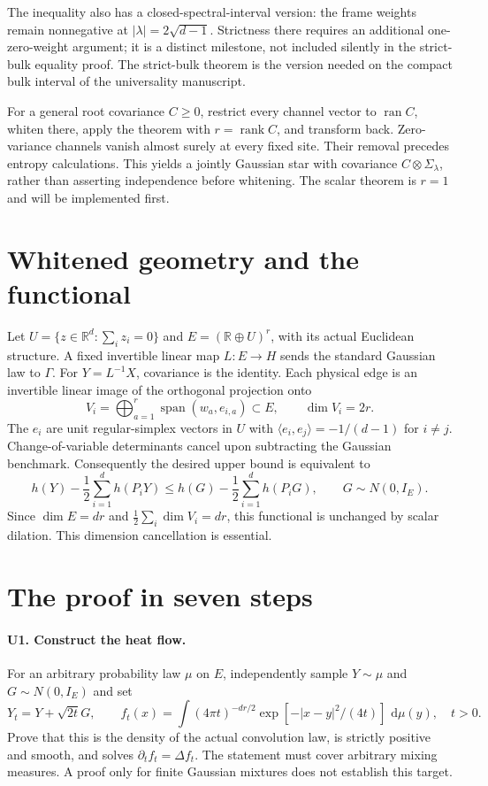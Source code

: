 \documentclass[11pt]{article}
\newcommand{\R}{\mathbb R}
\newcommand{\dd}{\,\mathrm d}
\begin{document}
The inequality also has a closed-spectral-interval version: the frame
weights remain nonnegative at $|\lambda|=2\sqrt{d-1}$. Strictness there
requires an additional one-zero-weight argument; it is a distinct
milestone, not included silently in the strict-bulk equality proof.
The strict-bulk theorem is the version needed on the compact bulk
interval of the universality manuscript.

For a general root covariance $C\geq0$, restrict every channel vector
to $\operatorname{ran}C$, whiten there, apply the theorem with
$r=\operatorname{rank}C$, and transform back. Zero-variance channels
vanish almost surely at every fixed site. Their removal precedes entropy
calculations. This yields a jointly Gaussian star with covariance
$C\otimes\Sigma_\lambda$, rather than asserting independence before
whitening. The scalar theorem is $r=1$ and will be implemented first.

\section{Whitened geometry and the functional}
Let $U=\{z\in\R^d:\sum_i z_i=0\}$ and
$E=(\R\oplus U)^r$, with its actual Euclidean structure. A fixed invertible
linear map $L:E\to H$ sends the standard Gaussian law to $\Gamma$.
For $Y=L^{-1}X$, covariance is the identity. Each physical edge is an
invertible linear image of the orthogonal projection onto
\[
 V_i=\bigoplus_{a=1}^r\operatorname{span}(w_a,e_{i,a})\subset E,
 \qquad \dim V_i=2r.
\]
The $e_i$ are unit regular-simplex vectors in $U$ with
$\langle e_i,e_j\rangle=-1/(d-1)$ for $i\ne j$.
Change-of-variable determinants cancel upon subtracting the Gaussian
benchmark. Consequently the desired upper bound is equivalent to
\[
 h(Y)-\frac12\sum_{i=1}^d h(P_iY)
 \leq h(G)-\frac12\sum_{i=1}^d h(P_iG),
 \qquad G\sim N(0,I_E).
\]
Since $\dim E=dr$ and $\frac12\sum_i\dim V_i=dr$, this functional is
unchanged by scalar dilation. This dimension cancellation is essential.

\section{The proof in seven steps}
\paragraph{U1. Construct the heat flow.}
For an arbitrary probability law $\mu$ on $E$, independently sample
$Y\sim\mu$ and $G\sim N(0,I_E)$ and set
\[
 Y_t=Y+\sqrt{2t}G,\qquad
 f_t(x)=\int (4\pi t)^{-dr/2}
               \exp[-|x-y|^2/(4t)]\,\dd\mu(y),\quad t>0.
\]
Prove that this is the density of the actual convolution law, is strictly
positive and smooth, and solves $\partial_tf_t=\Delta f_t$.
The statement must cover arbitrary mixing measures. A proof only for
finite Gaussian mixtures does not establish this target.
\end{document}
